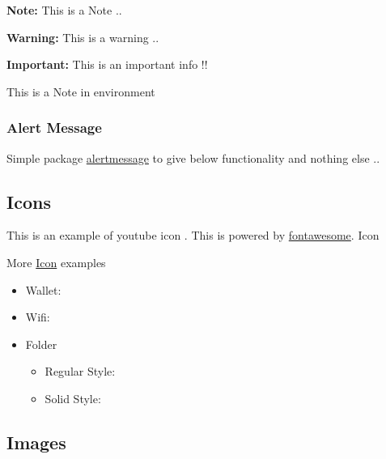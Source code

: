\documentclass{report}[a4paper,12pt] %
\begin{document}
\newcommand{\note}[1]{\begin{noteBox} \textbf{Note:} #1 \end{noteBox}}
\newcommand{\warning}[1]{\begin{hintBox} \textbf{Warning:} #1 \end{hintBox}}
\newcommand{\important}[1]{\begin{importantBox} \textbf{Important:} #1 \end{importantBox}}

\note{This is a Note ..}
\warning{This is a warning ..}
\important{This is an important info !!}

\begin{noteBox}
  This is a Note in environment
\end{noteBox}

\subsubsection{Alert Message}

Simple package \href{https://www.ctan.org/pkg/alertmessage}{alertmessage} to give below
functionality and nothing else ..


\subsection{Icons}
This is an example of youtube icon . This is powered by \href{https://www.ctan.org/pkg/fontawesome}{fontawesome}.
Icon

More \href{https://fontawesome.com/v5/search?o=r&m=free}{Icon} examples
\begin{itemize}
  \item Wallet: 
  \item Wifi: 
  \item Folder
  \begin{itemize}
    \item Regular Style: 
    \item Solid Style: 
  \end{itemize}
\end{itemize}

\newpage
\subsection{Images}
\end{document}
